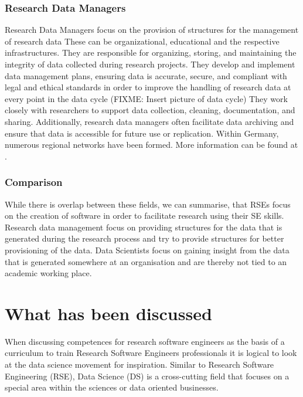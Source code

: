 \documentclass[
        english,biblatex
    ]{lni}
\begin{document}
    \subsubsection{Research Data Managers}\label{research-data-managers}

    Research Data Managers focus on the provision of structures for the
    management of research data These can be organizational, educational
    and the respective infrastructures. They are responsible for
    organizing, storing, and maintaining the integrity of data collected
    during research projects. They develop and implement data management
    plans, ensuring data is accurate, secure, and compliant with legal
    and ethical standards in order to improve the handling of research
    data at every point in the data cycle (FIXME: Insert picture of data
    cycle) They work closely with researchers to support data
    collection, cleaning, documentation, and sharing. Additionally,
    research data managers often facilitate data archiving and ensure
    that data is accessible for future use or replication. Within
    Germany, numerous regional networks have been formed. More
    information can be found at \cite{fdminfo}.

    \subsubsection{Comparison}\label{comparison}

    While there is overlap between these fields, we can summarise, that
    RSEs focus on the creation of software in order to facilitate
    research using their SE skills. Research data management focus on
    providing structures for the data that is generated during the
    research process and try to provide structures for better
    provisioning of the data. Data Scientists focus on gaining insight
    from the data that is generated somewhere at an organisation and are
    thereby not tied to an academic working place.

    \section{What has been discussed}\label{what-has-been-discussed}

    When discussing competences for research software engineers as the
    basis of a curriculum to train Research Software Engineers
    professionals it is logical to look at the data science movement for
    inspiration. Similar to Research Software Engineering (RSE), Data
    Science (DS) is a cross-cutting field that focuses on a special area
    within the sciences or data oriented businesses.
\end{document}
